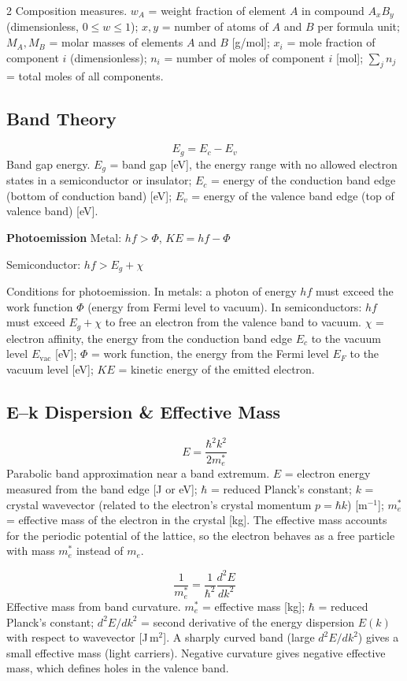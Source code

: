 \documentclass[9pt]{extarticle}
\newcommand{\eqlabel}[1]{\textbf{\scriptsize #1}\;}
\newcommand{\desc}[1]{{\small\color{desc}#1}}
\begin{document}
\begin{multicols}{2}
\desc{Composition measures. $w_A$ = weight fraction of element $A$ in compound $A_x B_y$ (dimensionless, $0 \leq w \leq 1$); $x, y$ = number of atoms of $A$ and $B$ per formula unit; $M_A, M_B$ = molar masses of elements $A$ and $B$ [g/mol]; $x_i$ = mole fraction of component $i$ (dimensionless); $n_i$ = number of moles of component $i$ [mol]; $\sum_j n_j$ = total moles of all components.}

\subsection{Band Theory}
\[E_g = E_c - E_v\]
\desc{Band gap energy. $E_g$ = band gap [eV], the energy range with no allowed electron states in a semiconductor or insulator; $E_c$ = energy of the conduction band edge (bottom of conduction band) [eV]; $E_v$ = energy of the valence band edge (top of valence band) [eV].}

\eqlabel{Photoemission}
Metal: $hf > \Phi$, \; $KE = hf - \Phi$

Semiconductor: $hf > E_g + \chi$

\desc{Conditions for photoemission. In metals: a photon of energy $hf$ must exceed the work function $\Phi$ (energy from Fermi level to vacuum). In semiconductors: $hf$ must exceed $E_g + \chi$ to free an electron from the valence band to vacuum. $\chi$ = electron affinity, the energy from the conduction band edge $E_c$ to the vacuum level $E_{\text{vac}}$ [eV]; $\Phi$ = work function, the energy from the Fermi level $E_F$ to the vacuum level [eV]; $KE$ = kinetic energy of the emitted electron.}

\subsection{E--k Dispersion \& Effective Mass}
\[E = \frac{\hbar^2 k^2}{2m_e^*}\]
\desc{Parabolic band approximation near a band extremum. $E$ = electron energy measured from the band edge [J or eV]; $\hbar$ = reduced Planck's constant; $k$ = crystal wavevector (related to the electron's crystal momentum $p = \hbar k$) [m$^{-1}$]; $m_e^*$ = effective mass of the electron in the crystal [kg]. The effective mass accounts for the periodic potential of the lattice, so the electron behaves as a free particle with mass $m_e^*$ instead of $m_e$.}

\[\frac{1}{m_e^*} = \frac{1}{\hbar^2}\frac{d^2E}{dk^2}\]
\desc{Effective mass from band curvature. $m_e^*$ = effective mass [kg]; $\hbar$ = reduced Planck's constant; $d^2E/dk^2$ = second derivative of the energy dispersion $E(k)$ with respect to wavevector [J\,m$^2$]. A sharply curved band (large $d^2E/dk^2$) gives a small effective mass (light carriers). Negative curvature gives negative effective mass, which defines holes in the valence band.}


\end{multicols}
\end{document}
